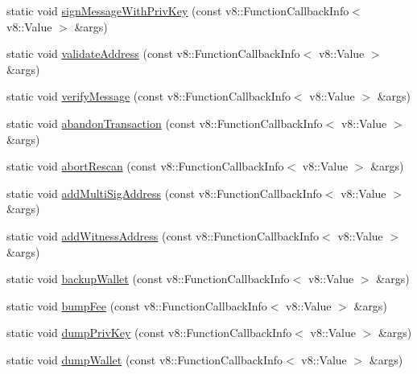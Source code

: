 \begin{DoxyCompactItemize}
\item 
static void \mbox{\hyperlink{class_rad_j_a_v_1_1_blockchain_v1_a4e74e71dd8586e0120b34821d53534b1}{sign\+Message\+With\+Priv\+Key}} (const v8\+::\+Function\+Callback\+Info$<$ v8\+::\+Value $>$ \&args)
\item 
static void \mbox{\hyperlink{class_rad_j_a_v_1_1_blockchain_v1_a4bf7b64d6530ccedf6480060d5c2bd73}{validate\+Address}} (const v8\+::\+Function\+Callback\+Info$<$ v8\+::\+Value $>$ \&args)
\item 
static void \mbox{\hyperlink{class_rad_j_a_v_1_1_blockchain_v1_ae047ae673c04a42d2fb82fe588c253bb}{verify\+Message}} (const v8\+::\+Function\+Callback\+Info$<$ v8\+::\+Value $>$ \&args)
\item 
static void \mbox{\hyperlink{class_rad_j_a_v_1_1_blockchain_v1_aeebfff8fbed8ce3edfbd6dda19acb9a9}{abandon\+Transaction}} (const v8\+::\+Function\+Callback\+Info$<$ v8\+::\+Value $>$ \&args)
\item 
static void \mbox{\hyperlink{class_rad_j_a_v_1_1_blockchain_v1_a39f525753968dbcd98ede6bd29eafb76}{abort\+Rescan}} (const v8\+::\+Function\+Callback\+Info$<$ v8\+::\+Value $>$ \&args)
\item 
static void \mbox{\hyperlink{class_rad_j_a_v_1_1_blockchain_v1_a5bc10bfb78a9c35453c7d6076b50d17e}{add\+Multi\+Sig\+Address}} (const v8\+::\+Function\+Callback\+Info$<$ v8\+::\+Value $>$ \&args)
\item 
static void \mbox{\hyperlink{class_rad_j_a_v_1_1_blockchain_v1_a719bee42d04a02ed3504e4e73267c088}{add\+Witness\+Address}} (const v8\+::\+Function\+Callback\+Info$<$ v8\+::\+Value $>$ \&args)
\item 
static void \mbox{\hyperlink{class_rad_j_a_v_1_1_blockchain_v1_a8d44413ea4fd3db0e9a408bfd9ea262a}{backup\+Wallet}} (const v8\+::\+Function\+Callback\+Info$<$ v8\+::\+Value $>$ \&args)
\item 
static void \mbox{\hyperlink{class_rad_j_a_v_1_1_blockchain_v1_a7a214577119111559c7a8512d4d4b2cb}{bump\+Fee}} (const v8\+::\+Function\+Callback\+Info$<$ v8\+::\+Value $>$ \&args)
\item 
static void \mbox{\hyperlink{class_rad_j_a_v_1_1_blockchain_v1_a8660c23f2966075b45a792268b75b6dc}{dump\+Priv\+Key}} (const v8\+::\+Function\+Callback\+Info$<$ v8\+::\+Value $>$ \&args)
\item 
static void \mbox{\hyperlink{class_rad_j_a_v_1_1_blockchain_v1_ab31ed075f3bb9cd64383342a4dc5988c}{dump\+Wallet}} (const v8\+::\+Function\+Callback\+Info$<$ v8\+::\+Value $>$ \&args)
\item 

\end{DoxyCompactItemize}
